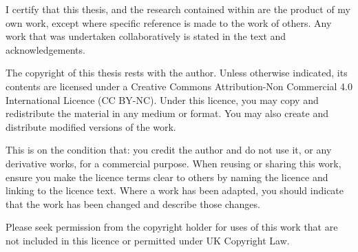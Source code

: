 \begin{declaration}
    I certify that this thesis, and the research contained within are the product of my own work, except where specific reference is made to the work of others. Any work that was undertaken collaboratively is stated in the text and acknowledgements.
    
\end{declaration}

\begin{copyright_dec}
    The copyright of this thesis rests with the author. Unless otherwise indicated, its contents are licensed under a Creative Commons Attribution-Non Commercial 4.0 International Licence (CC BY-NC).
    Under this licence, you may copy and redistribute the material in any medium or format. You may also create and distribute modified versions of the work.

    This is on the condition that: you credit the author and do not use it, or any derivative works, for a commercial purpose.
    When reusing or sharing this work, ensure you make the licence terms clear to others by naming the licence and linking to the licence text. Where a work has been adapted, you should indicate that the work has been changed and describe those changes.

    Please seek permission from the copyright holder for uses of this work that are not included in this licence or permitted under UK Copyright Law.
\end{copyright_dec}